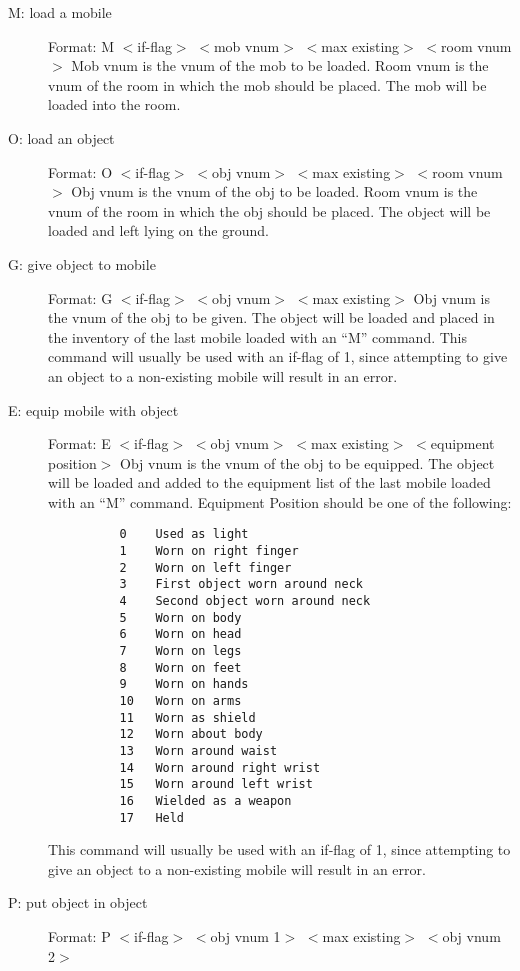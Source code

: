 \documentclass[11pt]{article}
\begin{document}
\begin{description}
\item[M: load a mobile] Format: M $<$if-flag$>$ $<$mob vnum$>$ $<$max existing$>$ $<$room vnum$>$\newline
Mob vnum is the vnum of the mob to be loaded.  Room vnum is the vnum of the room in which the mob should be placed.  The mob will be loaded into the room.
\item[O: load an object] Format: O $<$if-flag$>$ $<$obj vnum$>$ $<$max existing$>$ $<$room vnum$>$\newline
Obj vnum is the vnum of the obj to be loaded.  Room vnum is the vnum of the room in which the obj should be placed.  The object will be loaded and left lying on the ground.
\item[G: give object to mobile] Format: G $<$if-flag$>$ $<$obj vnum$>$ $<$max existing$>$\newline
Obj vnum is the vnum of the obj to be given.  The object will be loaded and placed in the inventory of the last mobile loaded with an ``M'' command.\newline
This command will usually be used with an if-flag of 1, since attempting to give an object to a non-existing mobile will result in an error.
\item[E: equip mobile with object] Format: E $<$if-flag$>$ $<$obj vnum$>$ $<$max existing$>$ $<$equipment position$>$\newline
Obj vnum is the vnum of the obj to be equipped.  The object will be loaded and added to the equipment list of the last mobile loaded with an ``M'' command.  Equipment Position should be one of the following:
\begin{verbatim}
          0    Used as light
          1    Worn on right finger
          2    Worn on left finger
          3    First object worn around neck
          4    Second object worn around neck
          5    Worn on body
          6    Worn on head
          7    Worn on legs
          8    Worn on feet
          9    Worn on hands
          10   Worn on arms
          11   Worn as shield
          12   Worn about body
          13   Worn around waist
          14   Worn around right wrist
          15   Worn around left wrist
          16   Wielded as a weapon
          17   Held
\end{verbatim}
This command will usually be used with an if-flag of 1, since attempting to give an object to a non-existing mobile will result in an error.
\item[P: put object in object] Format: P $<$if-flag$>$ $<$obj vnum 1$>$ $<$max existing$>$ $<$obj vnum 2$>$\newline

\end{description}
\end{document}
